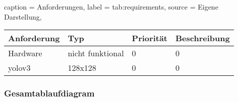 \begin{dhbwtable}{%
    caption	= Anforderungen,
    label	= tab:requirements,
    source	= Eigene Darstellung,
}

\begin{tabular}{llll}
    \toprule
    \textbf{Anforderung}     & \textbf{Typ}    & \textbf{Priorität}   & \textbf{Beschreibung}\\\midrule
    Hardware              & nicht funktional               & 0                             & 0\\
    yolov3              & 128x128               & 0                             & 0\\\bottomrule
\end{tabular}   
    
\end{dhbwtable}

\subsubsection{Gesamtablaufdiagram}